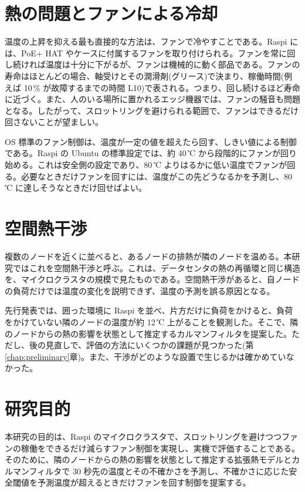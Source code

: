 \section{熱の問題とファンによる冷却}
温度の上昇を抑える最も直接的な方法は、ファンで冷やすことである。Raspi には、PoE+ HAT やケースに付属するファンを取り付けられる。ファンを常に回し続ければ温度は十分に下がるが、ファンは機械的に動く部品である。ファンの寿命はほとんどの場合、軸受けとその潤滑剤(グリース)で決まり、稼働時間(例えば 10\,\% が故障するまでの時間 L10)で表される\cite{kim1996fanlife}。つまり、回し続けるほど寿命に近づく。また、人のいる場所に置かれるエッジ機器では、ファンの騒音も問題となる。したがって、スロットリングを避けられる範囲で、ファンはできるだけ回さないことが望ましい。

OS 標準のファン制御は、温度が一定の値を超えたら回す、しきい値による制御である。Raspi の Ubuntu の標準設定では、約 40\,℃ から段階的にファンが回り始める。これは安全側の設定であり、80\,℃ よりはるかに低い温度でファンが回る。必要なときだけファンを回すには、温度がこの先どうなるかを予測し、80\,℃ に達しそうなときだけ回せばよい。

\section{空間熱干渉}
複数のノードを近くに並べると、あるノードの排熱が隣のノードを温める。本研究ではこれを空間熱干渉と呼ぶ。これは、データセンタの熱の再循環\cite{tang2008sensor,moore2005cool}と同じ構造を、マイクロクラスタの規模で見たものである。空間熱干渉があると、自ノードの負荷だけでは温度の変化を説明できず、温度の予測を誤る原因となる。

先行発表\cite{suzuki2026ipsj}では、囲った環境に Raspi を並べ、片方だけに負荷をかけると、負荷をかけていない隣のノードの温度が約 12\,℃ 上がることを観測した。そこで、隣のノードからの熱の影響を状態として推定するカルマンフィルタを提案した。ただし、後の見直しで、評価の方法にいくつかの課題が見つかった(第\ref{chap:preliminary}章)。また、干渉がどのような設置で生じるかは確かめていなかった。

\section{研究目的}
本研究の目的は、Raspi のマイクロクラスタで、スロットリングを避けつつファンの稼働をできるだけ減らすファン制御を実現し、実機で評価することである。そのために、隣のノードからの熱の影響を状態として推定する拡張熱モデルとカルマンフィルタで 30 秒先の温度とその不確かさを予測し、不確かさに応じた安全閾値を予測温度が超えるときだけファンを回す制御を提案する。

